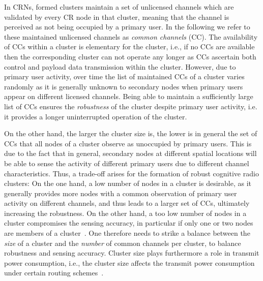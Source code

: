 \documentclass[times]{ettauth}
\newcommand{\ie}{i.e., }
\theoremstyle{mytheoremstyle}
\theoremstyle{mytheoremstyle}
\theoremstyle{mytheoremstyle}
\begin{document}
In CRNs, formed clusters maintain a set of unlicensed channels which are validated by every CR node in that cluster, meaning that the channel is perceived as not being occupied by a primary user.
In the following we refer to these maintained unlicensed channels as \textit{common channels} (CC).
The availability of CCs within a cluster is elementary for the cluster, \ie if no CCs are available then the corresponding cluster can not operate any longer as CCs ascertain both control and payload data transmission within the cluster.
However, due to primary user activity, over time the list of maintained CCs of a cluster varies randomly as it is generally unknown to secondary nodes when primary users appear on different licensed channels. 
Being able to maintain a sufficiently large list of CCs ensures the \textit{robustness} of the cluster despite primary user activity, i.e. it provides a longer uninterrupted operation of the cluster.

On the other hand, the larger the cluster size is, the lower is in general the set of CCs that all nodes of a cluster observe as unoccupied by primary users.
This is due to the fact that in general, secondary nodes at different spatial locations will be able to sense the activity of different primary users due to different channel characteristics. 
Thus, a trade-off arises for the formation of robust cognitive radio clusters:
On the one hand, a low number of nodes in a cluster is desirable, as it generally provides more nodes with a common observation of primary user activity on different channels, and thus leads to a larger set of CCs, ultimately increasing the robustness. 
On the other hand, a too low number of nodes in a cluster compromises the sensing accuracy, in particular if only one or two nodes are members of a cluster~\cite{Consensus_based_clustering12}.
One therefore needs to strike a balance between the \textit{size} of a cluster and the \textit{number} of common channels per cluster, to balance robustness and sensing accuracy.
Cluster size plays furthermore a role in transmit power consumption, \ie the cluster size affects the transmit power consumption under certain routing schemes~\cite{clustering_globecom11, EnergyEfficientClusteringRouting_2015}.
\end{document}
